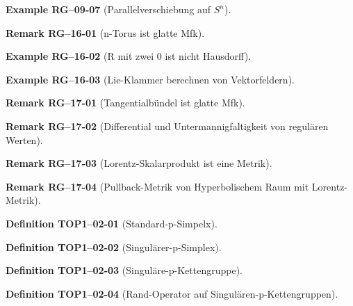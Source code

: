 \documentclass[10pt, letterpaper]{article}
\newcommand{\CustomHeading}[3]{%
  \par\medskip\noindent%
  \textbf{#1 #2} \textnormal{(#3)}.\enskip%
}
\newenvironment{DEF}[2]{\CustomHeading{Definition}{#1}{#2}}{}
\newenvironment{REM}[2]{\CustomHeading{Remark}{#1}{#2}}{}
\newenvironment{EXA}[2]{\CustomHeading{Example}{#1}{#2}}{}
\begin{document}
\begin{EXA}{RG--09-07}{Parallelverschiebung auf $S^n$}
\end{EXA}

\begin{REM}{RG--16-01}{n-Torus ist glatte Mfk}
\end{REM}

\begin{EXA}{RG--16-02}{R mit zwei $0$ ist nicht Hausdorff}
\end{EXA}

\begin{EXA}{RG--16-03}{Lie-Klammer berechnen von Vektorfeldern}
\end{EXA}

\begin{REM}{RG--17-01}{Tangentialbündel ist glatte Mfk}
\end{REM}

\begin{REM}{RG--17-02}{Differential und Untermannigfaltigkeit von regulären Werten}
\end{REM}

\begin{REM}{RG--17-03}{Lorentz-Skalarprodukt ist eine Metrik}
\end{REM}

\begin{REM}{RG--17-04}{Pullback-Metrik von Hyperbolischem Raum mit Lorentz-Metrik}
\end{REM}

\begin{DEF}{TOP1--02-01}{Standard-p-Simpelx}
\end{DEF}

\begin{DEF}{TOP1--02-02}{Singulärer-p-Simplex}
\end{DEF}

\begin{DEF}{TOP1--02-03}{Singuläre-p-Kettengruppe}
\end{DEF}

\begin{DEF}{TOP1--02-04}{Rand-Operator auf Singulären-p-Kettengruppen}
\end{DEF}
\end{document}
